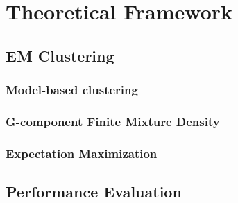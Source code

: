 \chapter{Theoretical Framework}
\label{sec:theoreticalframework} 


\section{EM Clustering}
\label{sec:modelbased_ch3}

\subsection{Model-based clustering}
\label{sec:gcomponentmixturedensity}

\subsection{G-component Finite Mixture Density}
\label{sec:gcomponentmixturedensity}

\subsection{Expectation Maximization}
\label{sec:em}

\section{Performance Evaluation}
\label{sec:emclustering_ch3}
